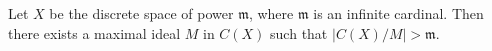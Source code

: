 Let $X$ be the discrete space of power $\mathfrak{m}$, where $\mathfrak{m}$ is an infinite cardinal. Then there exists a maximal ideal $M$ in $C(X)$ such that $|C(X)/M| > \mathfrak{m}$.